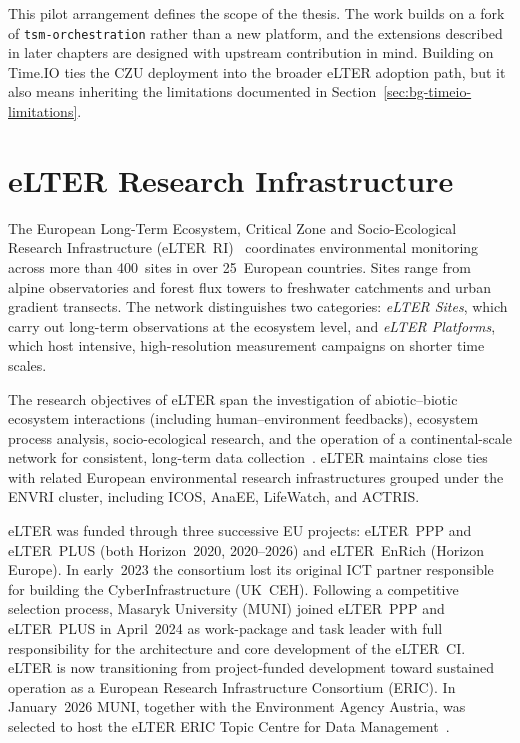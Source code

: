 This pilot arrangement defines the scope of the thesis. The work builds on a fork of
\texttt{tsm-orchestration} rather than a new platform, and the extensions described in
later chapters are designed with upstream contribution in mind. Building on Time.IO ties
the CZU deployment into the broader eLTER adoption path, but it also means inheriting
the limitations documented in Section~\ref{sec:bg-timeio-limitations}.

\section{eLTER Research Infrastructure}
\label{sec:bg-elter}

The European Long-Term Ecosystem, Critical Zone and Socio-Ecological Research Infrastructure
(eLTER~RI)~\cite{elter-ref} coordinates environmental monitoring across more than 400~sites
in over 25~European countries. Sites range from alpine observatories and forest flux towers
to freshwater catchments and urban gradient transects. The network distinguishes two
categories: \emph{eLTER Sites}, which carry out long-term observations at the ecosystem
level, and \emph{eLTER Platforms}, which host intensive, high-resolution measurement campaigns
on shorter time scales.

The research objectives of eLTER span the investigation of abiotic--biotic ecosystem
interactions (including human--environment feedbacks), ecosystem process analysis,
socio-ecological research, and the operation of a continental-scale network for consistent,
long-term data collection~\cite{elter-plus-d11.3}. eLTER maintains close ties with
related European environmental research infrastructures grouped under the ENVRI cluster,
including ICOS, AnaEE, LifeWatch, and ACTRIS.

eLTER was funded through three successive EU projects: eLTER~PPP and eLTER~PLUS (both
Horizon~2020, 2020--2026) and eLTER~EnRich (Horizon Europe). In early~2023 the
consortium lost its original ICT partner responsible for building the CyberInfrastructure
(UK~CEH). Following a competitive selection process, Masaryk University (MUNI) joined
eLTER~PPP and eLTER~PLUS in April~2024 as work-package and task leader with full
responsibility for the architecture and core development of the eLTER~CI. eLTER is now
transitioning from project-funded development toward sustained operation as a European
Research Infrastructure Consortium (ERIC). In January~2026 MUNI, together with the
Environment Agency Austria, was selected to host the eLTER ERIC Topic Centre for Data
Management~\cite{elter-ref}.

